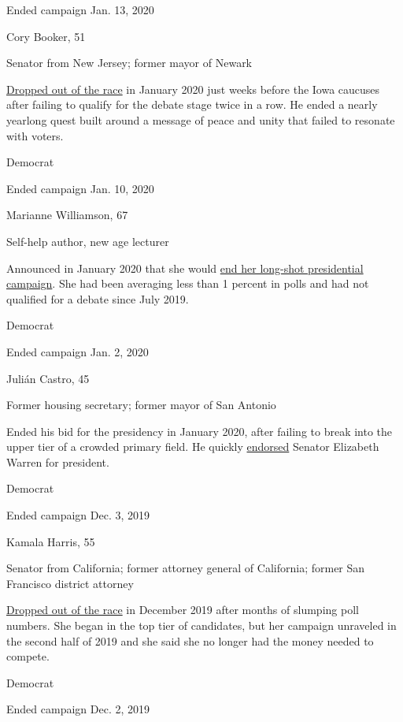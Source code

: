 Ended campaign Jan. 13, 2020

Cory Booker, 51

Senator from New Jersey; former mayor of Newark

\href{https://www.nytimes3xbfgragh.onion/2020/01/13/us/politics/cory-booker-drops-out.html}{Dropped
out of the race} in January 2020 just weeks before the Iowa caucuses
after failing to qualify for the debate stage twice in a row. He ended a
nearly yearlong quest built around a message of peace and unity that
failed to resonate with voters.

Democrat

Ended campaign Jan. 10, 2020

Marianne Williamson, 67

Self-help author, new age lecturer

Announced in January 2020 that she would
\href{https://www.nytimes3xbfgragh.onion/2020/01/10/us/politics/marianne-williamson-dropping-out.html}{end
her long-shot presidential campaign}. She had been averaging less than 1
percent in polls and had not qualified for a debate since July 2019.

Democrat

Ended campaign Jan. 2, 2020

Julián Castro, 45

Former housing secretary; former mayor of San Antonio

Ended his bid for the presidency in January 2020, after failing to break
into the upper tier of a crowded primary field. He quickly
\href{https://www.nytimes3xbfgragh.onion/2020/01/06/us/politics/julian-castro-endorsement-elizabeth-warren.html}{endorsed}
Senator Elizabeth Warren for president.

Democrat

Ended campaign Dec. 3, 2019

Kamala Harris, 55

Senator from California; former attorney general of California; former
San Francisco district attorney

\href{https://www.nytimes3xbfgragh.onion/2019/12/03/us/politics/kamala-harris-campaign-drops-out.html}{Dropped
out of the race} in December 2019 after months of slumping poll numbers.
She began in the top tier of candidates, but her campaign unraveled in
the second half of 2019 and she said she no longer had the money needed
to compete.

Democrat

Ended campaign Dec. 2, 2019

